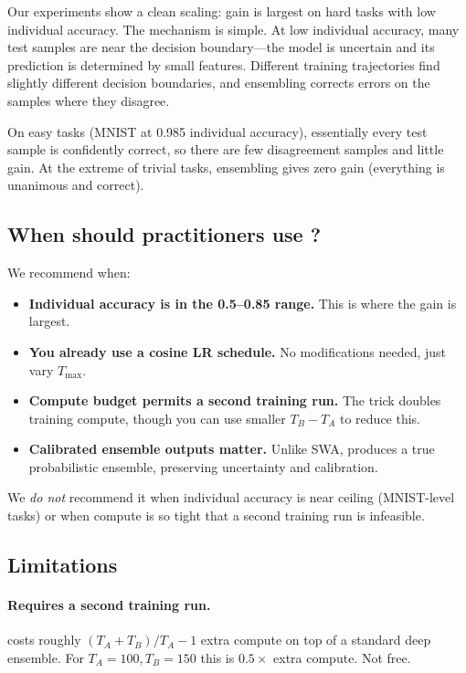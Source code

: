 Our experiments show a clean scaling: gain is largest on hard tasks with
low individual accuracy. The mechanism is simple. At low individual
accuracy, many test samples are near the decision boundary---the model
is uncertain and its prediction is determined by small features. Different
training trajectories find slightly different decision boundaries, and
ensembling corrects errors on the samples where they disagree.

On easy tasks (MNIST at 0.985 individual accuracy), essentially every
test sample is confidently correct, so there are few disagreement samples
and little gain. At the extreme of trivial tasks, ensembling gives zero
gain (everything is unanimous and correct).

\subsection{When should practitioners use \ours?}

We recommend \ours{} when:
\begin{itemize}[leftmargin=*]
\item \textbf{Individual accuracy is in the 0.5--0.85 range.} This is where
the gain is largest.
\item \textbf{You already use a cosine LR schedule.} No modifications
needed, just vary $T_\mathrm{max}$.
\item \textbf{Compute budget permits a second training run.} The trick
doubles training compute, though you can use smaller $T_B - T_A$ to
reduce this.
\item \textbf{Calibrated ensemble outputs matter.} Unlike SWA, \ours{}
produces a true probabilistic ensemble, preserving uncertainty and
calibration.
\end{itemize}

We \emph{do not} recommend it when individual accuracy is near ceiling
(MNIST-level tasks) or when compute is so tight that a second training
run is infeasible.

\subsection{Limitations}

\paragraph{Requires a second training run.} \ours{} costs roughly
$(T_A + T_B)/T_A - 1$ extra compute on top of a standard
deep ensemble. For $T_A=100, T_B=150$ this is $0.5\times$ extra compute.
Not free.

